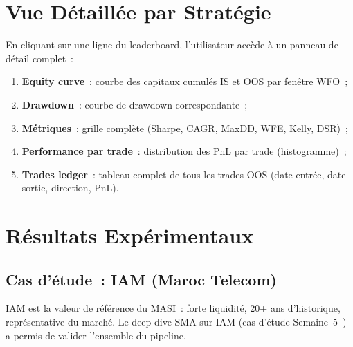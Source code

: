 
\section{Vue Détaillée par Stratégie}
\label{sec:detail_strategie}

En cliquant sur une ligne du leaderboard, l'utilisateur accède à un panneau de
détail complet~:

\begin{enumerate}
    \item \textbf{Equity curve}~: courbe des capitaux cumulés IS et OOS par fenêtre WFO~;
    \item \textbf{Drawdown}~: courbe de drawdown correspondante~;
    \item \textbf{Métriques}~: grille complète (Sharpe, CAGR, MaxDD, WFE, Kelly, DSR)~;
    \item \textbf{Performance par trade}~: distribution des PnL par trade (histogramme)~;
    \item \textbf{Trades ledger}~: tableau complet de tous les trades OOS (date entrée,
    date sortie, direction, PnL).
\end{enumerate}


\section{Résultats Expérimentaux}
\label{sec:resultats}

\subsection{Cas d'étude~: IAM (Maroc Telecom)}

IAM est la valeur de référence du MASI~: forte liquidité, 20+ ans d'historique,
représentative du marché. Le deep dive SMA sur IAM (cas d'étude Semaine~5~\cite{rapport_s5})
a permis de valider l'ensemble du pipeline.


